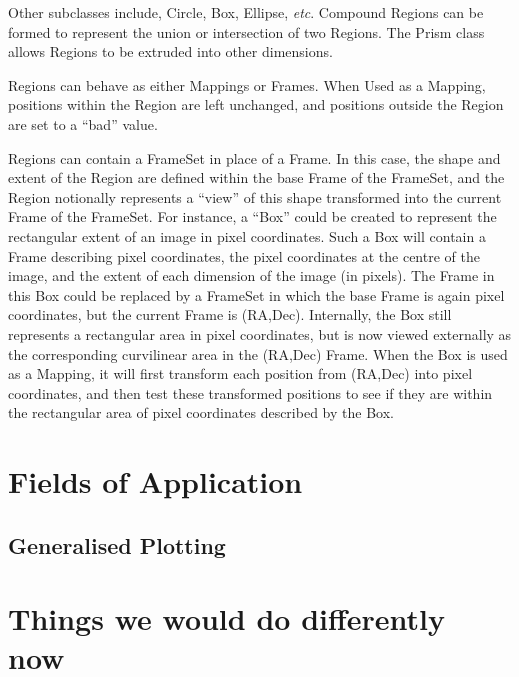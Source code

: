 \documentclass[final,authoryear,5p,times,twocolumn]{elsarticle}
\begin{document}
Other subclasses include, Circle, Box, Ellipse, \emph{etc}. Compound Regions
can be formed to represent the union or intersection of two
Regions. The Prism class allows Regions to be extruded into other
dimensions.

Regions can behave as either Mappings or Frames. When Used as a
Mapping, positions within the Region are left unchanged, and positions
outside the Region are set to a ``bad'' value.

Regions can contain a FrameSet in place of a Frame. In this case, the
shape and extent of the Region are defined within the base Frame of
the FrameSet, and the Region notionally represents a ``view'' of this
shape transformed into the current Frame of the FrameSet. For
instance, a ``Box'' could be created to represent the rectangular extent
of an image in pixel coordinates. Such a Box will contain a Frame
describing pixel coordinates, the pixel coordinates at the centre of
the image, and the extent of each dimension of the image (in
pixels). The Frame in this Box could be replaced by a FrameSet in
which the base Frame is again pixel coordinates, but the current Frame
is (RA,Dec). Internally, the Box still represents a rectangular area
in pixel coordinates, but is now viewed externally as the
corresponding curvilinear area in the (RA,Dec) Frame. When the Box is
used as a Mapping, it will first transform each position from (RA,Dec)
into pixel coordinates, and then test these transformed positions to
see if they are within the rectangular area of pixel coordinates
described by the Box.

\section{Fields of Application}



\subsection{Generalised Plotting}

\section{Things we would do differently now}
\end{document}
